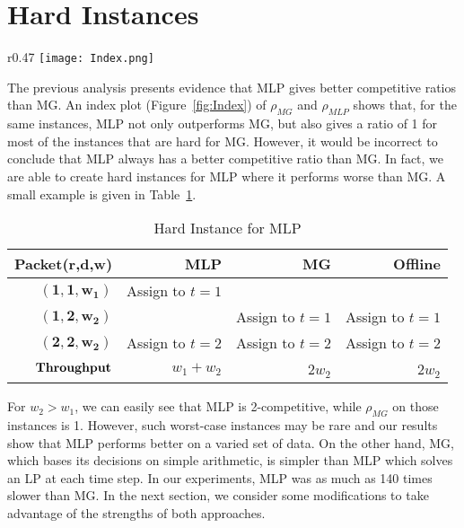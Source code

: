 \documentclass[oribibl]{llncs}
\begin{document}
\section{Hard Instances}
\label{sec:HI}
\begin{wrapfigure}[13]{r}{0.47\linewidth}
\vspace{-40pt}
\texttt{[image: Index.png]} 
\caption{Index plot of $\rho_{MLP}$(red) and $\rho_{MG}$(green)}
\label{fig:Index}
\end{wrapfigure}

The previous analysis presents evidence  that MLP gives better
competitive ratios than MG.
An index plot
(Figure~\ref{fig:Index}) of $\rho_{MG}$ and $\rho_{MLP}$ shows that,
for the same instances, MLP not only outperforms MG, but also gives a
ratio of 1 for most of the instances that are hard for MG.  
However, it would be incorrect to conclude that MLP always has a
better competitive ratio than MG.  In fact, 
we are able to
create hard instances for MLP where it performs worse than MG. A small 
example is given in Table~\ref{HI-example}.

\vspace{5pt}
\begin{table}[ht] \centering
 \begin{tabular}{|r||r|r|r|} 
 \hline
 Packet(r,d,w) \;\;\; & MLP \;\; & MG \;\; & Offline \;\;   \\ [0.5ex] 
 \hline\hline
 $\mathbf{(1,1,w_1)}$ &   \;\;\; Assign to $t=1$  & & \\ 
 \hline
 $\mathbf{(1,2,w_2)}$ & & \;\;\; Assign to $t=1$ &  \;\;\; Assign to $t=1$ \\
 \hline
 $\mathbf{(2,2,w_2)}$ &  \;\;\; Assign to $t=2$ &  \;\;\; Assign to $t=2$ &  \;\;\; Assign to $t=2$\\  
 \hline
 \hline
 \;\; $\bf{Throughput}$  & $w_1+w_2$& 2$w_2$ & 2$w_2$\\ [1ex] 
 \hline
\end{tabular}
 \caption{Hard Instance for MLP}
 \label{HI-example}
\end{table}

\vspace{-16pt}
 For $w_2 > w_1$, we can easily see that MLP is 2-competitive, while
 $\rho_{MG}$ on those instances is 1. However, such worst-case
 instances may be rare and our results show that MLP performs better
 on a varied set of data.  On the other hand, MG, which bases its decisions on
 simple arithmetic, is simpler than MLP which solves an LP at each time
 step. In our experiments, MLP was as much as 140 times slower than MG.
In the next section, we consider some modifications to take advantage
of the strengths of both approaches.
\end{document}

